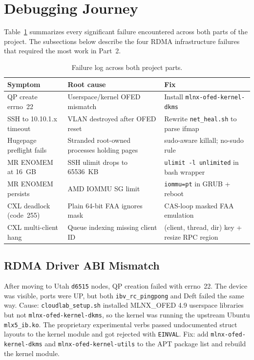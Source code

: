 \documentclass[10pt,twocolumn]{article}
\begin{document}
\section{Debugging Journey}
\label{sec:debugging}

Table~\ref{tab:bugs} summarizes every significant failure encountered across
both parts of the project.
The subsections below describe the four RDMA infrastructure failures that
required the most work in Part~2.

\begin{table}[H]
\centering
\footnotesize
\caption{Failure log across both project parts.}
\label{tab:bugs}
\begin{tabular}{p{1.8cm}p{2.2cm}p{2.5cm}}
\toprule
Symptom & Root cause & Fix \\
\midrule
QP create errno~22 & Userspace/kernel OFED mismatch & Install \texttt{mlnx-ofed-kernel-dkms} \\
SSH to 10.10.1.x timeout & VLAN destroyed after OFED reset & Rewrite \texttt{net\_heal.sh} to parse ifmap \\
Hugepage preflight fails & Stranded root-owned processes holding pages & sudo-aware killall; no-sudo rule \\
MR ENOMEM at 16~GB & SSH ulimit drops to 65536~KB & \texttt{ulimit -l unlimited} in bash wrapper \\
MR ENOMEM persists & AMD IOMMU SG limit & \texttt{iommu=pt} in GRUB + reboot \\
CXL deadlock (code~255) & Plain 64-bit FAA ignores mask & CAS-loop masked FAA emulation \\
CXL multi-client hang & Queue indexing missing client ID & (client, thread, dir) key + resize RPC region \\
\bottomrule
\end{tabular}
\end{table}

\subsection{RDMA Driver ABI Mismatch}

After moving to Utah \texttt{d6515} nodes, QP creation failed with errno~22.
The device was visible, ports were UP, but both \texttt{ibv\_rc\_pingpong} and
Deft failed the same way.
Cause: \texttt{cloudlab\_setup.sh} installed MLNX\_OFED 4.9 userspace libraries
but not \texttt{mlnx-ofed-kernel-dkms}, so the kernel was running the upstream
Ubuntu \texttt{mlx5\_ib.ko}.
The proprietary experimental verbs passed undocumented struct layouts to the
kernel module and got rejected with \texttt{EINVAL}.
Fix: add \texttt{mlnx-ofed-kernel-dkms} and \texttt{mlnx-ofed-kernel-utils}
to the APT package list and rebuild the kernel module.
\end{document}
